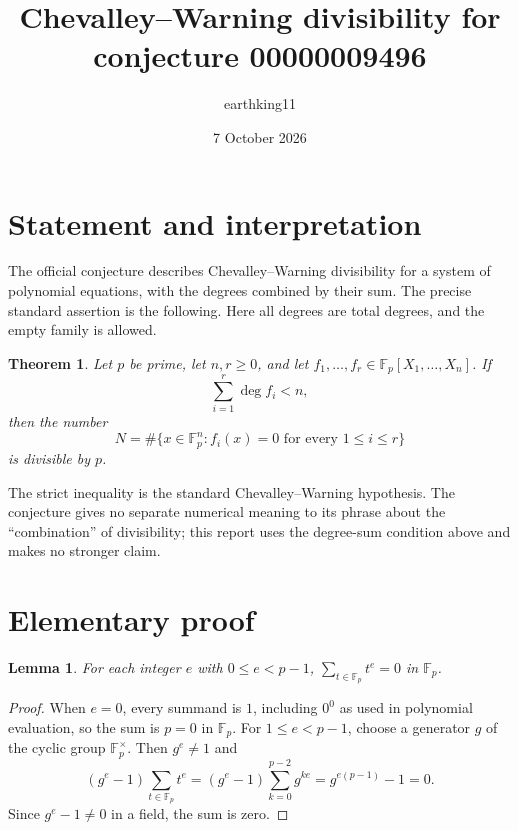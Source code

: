 \documentclass[11pt]{article}
\title{Chevalley--Warning divisibility for conjecture 00000009496}
\author{earthking11}
\date{7 October 2026}
\newtheorem{theorem}{Theorem}
\newtheorem{lemma}{Lemma}
\begin{document}
\maketitle

\section*{Statement and interpretation}
The official conjecture describes Chevalley--Warning divisibility for a
system of polynomial equations, with the degrees combined by their sum.
The precise standard assertion is the following. Here all degrees are total
degrees, and the empty family is allowed.

\begin{theorem}\label{thm:cw}
Let $p$ be prime, let $n,r\geq 0$, and let
$f_1,\ldots,f_r\in\mathbb F_p[X_1,\ldots,X_n]$. If
\[
  \sum_{i=1}^{r}\deg f_i<n,
\]
then the number
\[
  N=\#\{x\in\mathbb F_p^n:f_i(x)=0\text{ for every }1\leq i\leq r\}
\]
is divisible by $p$.
\end{theorem}

The strict inequality is the standard Chevalley--Warning hypothesis. The
conjecture gives no separate numerical meaning to its phrase about the
``combination'' of divisibility; this report uses the degree-sum condition
above and makes no stronger claim.

\section*{Elementary proof}
\begin{lemma}\label{lem:power}
For each integer $e$ with $0\leq e<p-1$,
$\sum_{t\in\mathbb F_p}t^e=0$ in $\mathbb F_p$.
\end{lemma}
\begin{proof}
When $e=0$, every summand is $1$, including $0^0$ as used in polynomial
evaluation, so the sum is $p=0$ in $\mathbb F_p$. For $1\leq e<p-1$,
choose a generator $g$ of the cyclic group $\mathbb F_p^\times$.
Then $g^e\neq1$ and
\[
  (g^e-1)\sum_{t\in\mathbb F_p}t^e
  =(g^e-1)\sum_{k=0}^{p-2}g^{ke}
  =g^{e(p-1)}-1=0.
\]
Since $g^e-1\neq0$ in a field, the sum is zero.
\end{proof}
\end{document}
